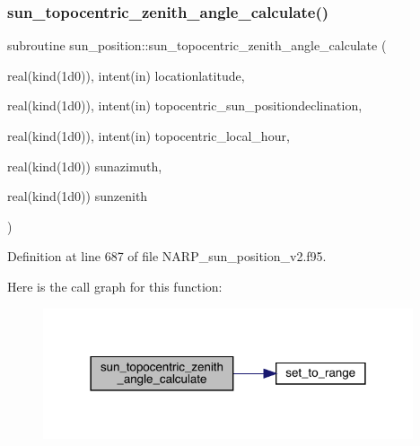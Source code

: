 \subsubsection{\texorpdfstring{sun\+\_\+topocentric\+\_\+zenith\+\_\+angle\+\_\+calculate()}{sun\_topocentric\_zenith\_angle\_calculate()}}
{\footnotesize\ttfamily subroutine sun\+\_\+position\+::sun\+\_\+topocentric\+\_\+zenith\+\_\+angle\+\_\+calculate (\begin{DoxyParamCaption}\item[{real(kind(1d0)), intent(in)}]{locationlatitude,  }\item[{real(kind(1d0)), intent(in)}]{topocentric\+\_\+sun\+\_\+positiondeclination,  }\item[{real(kind(1d0)), intent(in)}]{topocentric\+\_\+local\+\_\+hour,  }\item[{real(kind(1d0))}]{sunazimuth,  }\item[{real(kind(1d0))}]{sunzenith }\end{DoxyParamCaption})}



Definition at line 687 of file N\+A\+R\+P\+\_\+sun\+\_\+position\+\_\+v2.\+f95.

Here is the call graph for this function\+:\nopagebreak
\begin{figure}[H]
\begin{center}
\leavevmode
\includegraphics[width=309pt]{_n_a_r_p__sun__position__v2_8f95_a71be86eba8ca05519a30c0544be877e8_cgraph}
\end{center}
\end{figure}
\mbox{\label{_n_a_r_p__sun__position__v2_8f95_ae9ec08d0b901309126e9f9750f1beaf5}} 
